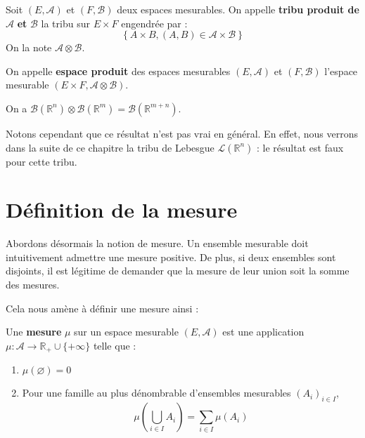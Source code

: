 \documentclass[../integ-proba.tex]{subfiles}
\begin{document}
  \begin{defi}
    Soit $\left(E, \mathcal{A}\right)$ et $\left(F, \mathcal{B}\right)$ deux espaces mesurables.
    On appelle \textbf{tribu produit de} $\mathcal{A}$ \textbf{et} $\mathcal{B}$ la tribu sur $E \times F$ engendrée par :
    $$
    \left\{A \times B, \left(A, B\right) \in \mathcal{A} \times \mathcal{B}\right\}
    $$
    On la note $\mathcal{A} \otimes \mathcal{B}$.

    On appelle \textbf{espace produit} des espaces mesurables $\left(E, \mathcal{A}\right)$ et $\left(F, \mathcal{B}\right)$ l'espace mesurable $\left(E \times F, \mathcal{A} \otimes \mathcal{B}\right)$.
  \end{defi}

  \begin{exemple}
    On a $\mathcal{B}(\mathbb{R}^n) \otimes \mathcal{B}(\mathbb{R}^m) = \mathcal{B}(\mathbb{R}^{m+n})$.

    Notons cependant que ce résultat n'est pas vrai en général.
    En effet, nous verrons dans la suite de ce chapitre la tribu de Lebesgue $\mathcal{L}(\mathbb{R}^n)$ : le résultat est faux pour cette tribu.
  \end{exemple}

  \section{Définition de la mesure}

  Abordons désormais la notion de mesure.
  Un ensemble mesurable doit intuitivement admettre une mesure positive.
  De plus, si deux ensembles sont disjoints, il est légitime de demander que la mesure de leur union soit la somme des mesures.

  Cela nous amène à définir une mesure ainsi :

  \begin{defi}
    Une \textbf{mesure} $\mu$ sur un espace mesurable $(E, \mathcal{A})$ est une application $\mu : \mathcal{A} \longrightarrow \mathbb{R}_+ \cup \{ +\infty \}$ telle que :
    \begin{enumerate}
      \item $\mu(\varnothing) = 0$
      \item Pour une famille au plus dénombrable d'ensembles mesurables $\left(A_i\right)_{i \in I}$,
      $$\mu\left(\bigcup_{i \in I}A_i\right) = \sum_{i \in I} \mu\left(A_i\right)$$
    \end{enumerate}
  \end{defi}
\end{document}
